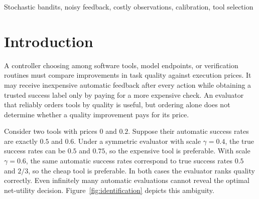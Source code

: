 
\maketitle
\begin{abstract}
A noisy evaluator can preserve the ranking of every pair of tools while concealing which tool maximizes quality minus execution cost. We study stochastic Bernoulli bandits with known action prices, a shared symmetric feedback channel of unknown reliability, and optional trusted audits. We characterize exactly the decision ambiguity remaining after all proxy means are known, using a linear program with only two channel endpoints. For learning from bandit feedback, a scale-calibrated UCB algorithm separates ordinary arm exploration from a single shared calibration estimate. For two arms, channel reliability bounded below by $1/4$, price spread $D\leq1/4$, and at most $B$ expected audits, we establish the minimax execution-regret rate $\softTheta(\sqrt T+DT/\sqrt{B+1})$. When each audit costs $a\in[0,1]$, the corresponding rate is $\softTheta(\sqrt T+\min\{DT,(aD^2)^{1/3}T^{2/3}\})$. The lower bounds use environments with exactly identical free-feedback laws. Thus heterogeneous prices make an otherwise unnecessary calibration parameter statistically consequential. We also give a finite-sample decision certificate and a bound under channel misspecification. Reproducible simulations expose the calibration tradeoff and its limitations: the proved algorithm is conservative and need not outperform direct audited learning on fixed instances.
\end{abstract}
\begin{keywords}
Stochastic bandits, noisy feedback, costly observations, calibration, tool selection
\end{keywords}

\section{Introduction}
A controller choosing among software tools, model endpoints, or verification routines must compare improvements in task quality against execution prices. It may receive inexpensive automatic feedback after every action while obtaining a trusted success label only by paying for a more expensive check. An evaluator that reliably orders tools by quality is useful, but ordering alone does not determine whether a quality improvement pays for its price.

Consider two tools with prices $0$ and $0.2$. Suppose their automatic success rates are exactly $0.5$ and $0.6$. Under a symmetric evaluator with scale $\gamma=0.4$, the true success rates can be $0.5$ and $0.75$, so the expensive tool is preferable. With scale $\gamma=0.6$, the same automatic success rates correspond to true success rates $0.5$ and $2/3$, so the cheap tool is preferable. In both cases the evaluator ranks quality correctly. Even infinitely many automatic evaluations cannot reveal the optimal net-utility decision. Figure~\ref{fig:identification} depicts this ambiguity.

